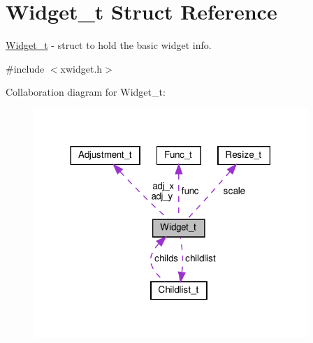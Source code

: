 \hypertarget{structWidget__t}{}\section{Widget\+\_\+t Struct Reference}
\label{structWidget__t}


\hyperlink{structWidget__t}{Widget\+\_\+t} -\/ struct to hold the basic widget info.  




{\ttfamily \#include $<$xwidget.\+h$>$}



Collaboration diagram for Widget\+\_\+t\+:
\nopagebreak
\begin{figure}[H]
\begin{center}
\leavevmode
\includegraphics[width=294pt]{structWidget__t__coll__graph}
\end{center}
\end{figure}
